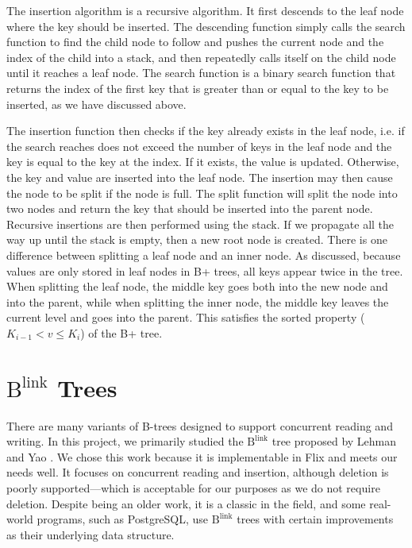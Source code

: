 \documentclass[11pt]{report}
\theoremstyle{definition}
\begin{document}
The insertion algorithm is a recursive algorithm. It first descends to the leaf node where the key should be inserted. The descending function simply calls the search function to find the child node to follow and pushes the current node and the index of the child into a stack, and then repeatedly calls itself on the child node until it reaches a leaf node. The search function is a binary search function that returns the index of the first key that is greater than or equal to the key to be inserted, as we have discussed above.

The insertion function then checks if the key already exists in the leaf node, i.e. if the search reaches does not exceed the number of keys in the leaf node and the key is equal to the key at the index. If it exists, the value is updated. Otherwise, the key and value are inserted into the leaf node. The insertion may then cause the node to be split if the node is full. The split function will split the node into two nodes and return the key that should be inserted into the parent node. Recursive insertions are then performed using the stack. If we propagate all the way up until the stack is empty, then a new root node is created. There is one difference between splitting a leaf node and an inner node. As discussed, because values are only stored in leaf nodes in B+ trees, all keys appear twice in the tree. When splitting the leaf node, the middle key goes both into the new node and into the parent, while when splitting the inner node, the middle key leaves the current level and goes into the parent. This satisfies the sorted property ($K_{i-1} < v \leq K_i$) of the B+ tree.

\section{$\text{B}^{\text{link}}$ Trees}

There are many variants of B-trees designed to support concurrent reading and writing. In this project, we primarily studied the $\text{B}^{\text{link}}$ tree proposed by Lehman and Yao \cite{10.1145/319628.319663}. We chose this work because it is implementable in Flix and meets our needs well. It focuses on concurrent reading and insertion, although deletion is poorly supported—which is acceptable for our purposes as we do not require deletion. Despite being an older work, it is a classic in the field, and some real-world programs, such as PostgreSQL, use $\text{B}^{\text{link}}$ trees with certain improvements as their underlying data structure.
\end{document}

